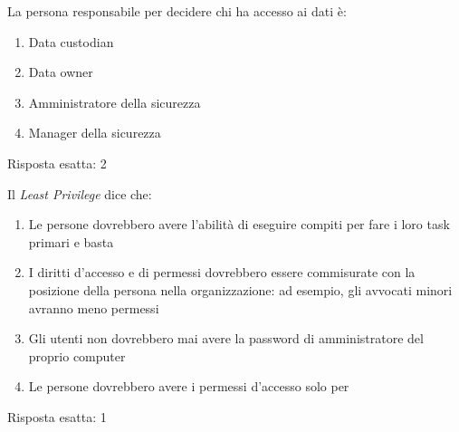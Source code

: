 \label{EsBCDR3}


\begin{Exercise} [
  title={Gestione dei dati},
  label={bcdr6}
 ]
 
 \Question La persona responsabile per decidere chi ha accesso ai dati è:
 \begin{enumerate}
   \item Data custodian
   \item Data owner
   \item Amministratore della sicurezza
   \item Manager della sicurezza
 \end{enumerate}
\end{Exercise}


\begin{Answer} [
  ref={bcdr6},
  number={6}
  ]
  
  \Question Risposta esatta: 2
  
\end{Answer}


\begin{Exercise} [
  title={Gestione dei dati},
  label={bcdr7}
  ]
  
  \Question Il \textit{Least Privilege} dice che:
  \begin{enumerate}
    \item Le persone dovrebbero avere l'abilità di eseguire compiti per fare i 
    loro task primari e basta
    \item I diritti d'accesso e di permessi dovrebbero essere commisurate con 
    la posizione della persona nella organizzazione: ad esempio, gli avvocati 
    minori avranno meno permessi
    \item Gli utenti non dovrebbero mai avere la password di amministratore del 
    proprio computer
    \item Le persone dovrebbero avere i permessi d'accesso solo per %
  \end{enumerate}
\end{Exercise}


\begin{Answer} [
  ref={bcdr7},
  number={7}
  ]
  
  \Question Risposta esatta: 1
  
\end{Answer}


